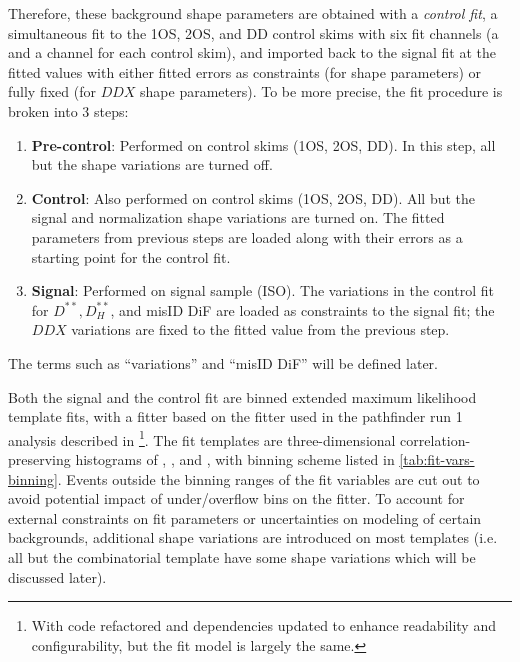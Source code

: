 Therefore, these background shape parameters are obtained with a
\emph{control fit},
a simultaneous fit to the 1OS, 2OS, and DD control skims with six fit channels
(a \Dz and a \Dstar channel for each control skim),
and imported back to the signal fit at the fitted values with either
fitted errors as constraints (for \Dstst shape parameters) or fully fixed
(for $DDX$ shape parameters).
To be more precise,
the fit procedure is broken into 3 steps:

\begin{enumerate}
    \item \textbf{Pre-control}:
        Performed on control skims (1OS, 2OS, DD).
        In this step, all but the \Kstar shape variations are turned off.
    \item \textbf{Control}:
        Also performed on control skims (1OS, 2OS, DD).
        All but the signal and normalization shape variations are turned on.
        The fitted parameters from previous steps are loaded along with their
        errors as a starting point for the control fit.
    \item \textbf{Signal}:
        Performed on signal sample (ISO).
        The variations in the control fit for $D^{**}, D_H^{**}$, and misID DiF
        are loaded as constraints to the signal fit;
        the $DDX$ variations are fixed to the fitted value from the previous
        step.
\end{enumerate}
The terms such as ``\Kstar variations'' and ``misID DiF'' will be defined later.

Both the signal and the control fit are binned extended maximum likelihood
template fits,
with a fitter based on the \HistFactory fitter
used in the pathfinder run 1 \RDX analysis described in
\cite{LHCb-ANA-2020-056}\footnote{
    With code refactored and dependencies updated to enhance readability and
    configurability,
    but the fit model is largely the same.
}.
The fit templates are three-dimensional correlation-preserving
histograms of \mmSq, \el, and \qSq,
with binning scheme listed in \cref{tab:fit-vars-binning}.
Events outside the binning ranges of the fit variables are cut out to avoid
potential impact of under/overflow bins on the fitter.
To account for external constraints on fit parameters or uncertainties on
modeling of certain backgrounds,
additional shape variations are introduced on most templates
(i.e. all but the \Dstar combinatorial template have some shape variations which
will be discussed later).

